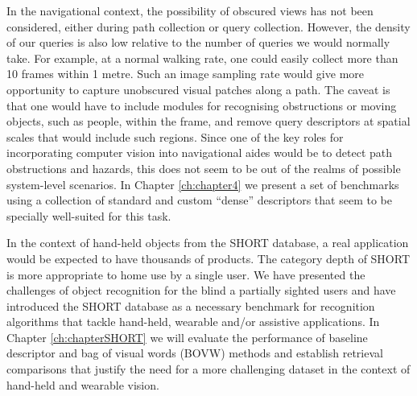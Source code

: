 In the navigational context, the possibility of obscured views has not been considered, either during path collection or query collection. However, the density of our queries is also low relative to the number of queries we would normally take. For example, at a normal walking rate, one could easily collect more than 10 frames within 1 metre. Such an image sampling rate would give more opportunity to capture unobscured visual patches along a path. The caveat is that one would have to include modules for recognising obstructions or moving objects, such as people, within the frame, and remove query descriptors at  spatial scales that would include such regions. Since one of the key roles for incorporating computer vision into navigational aides would be to detect path obstructions and hazards, this does not seem to be out of the realms of possible system-level scenarios. In Chapter \ref{ch:chapter4} we present a set of benchmarks using a collection of standard and custom ``dense'' descriptors that seem to be specially well-suited for this task.

In the context of hand-held objects from the SHORT database, a real application would be expected to have thousands of products. The category depth of SHORT is more appropriate to home use by a single user. We have presented the challenges of object recognition for the blind a partially sighted users and have introduced the SHORT database as a necessary benchmark for recognition algorithms that tackle hand-held, wearable and/or assistive applications. In Chapter \ref{ch:chapterSHORT} we will evaluate the performance of baseline descriptor and bag of visual words (BOVW) methods  and establish retrieval comparisons that justify the need for a more challenging dataset in the context of hand-held and wearable vision.




